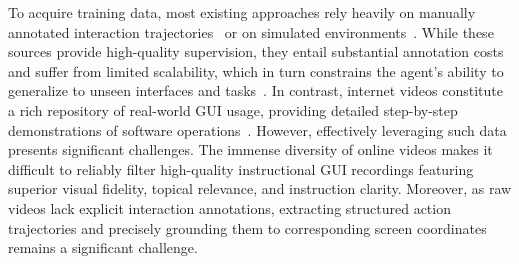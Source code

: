 \documentclass{article}
\theoremstyle{plain}
\theoremstyle{definition}
\theoremstyle{remark}
\begin{document}
To acquire training data, most existing approaches rely heavily on manually annotated interaction trajectories~\citep{deka2017rico, rawles2023androidinthewild} or on simulated environments~\citep{shvo2021appbuddy, lee2024benchmarking}. While these sources provide high-quality supervision, they entail substantial annotation costs and suffer from limited scalability, which in turn constrains the agent’s ability to generalize to unseen interfaces and tasks~\citep{gao2024multi}. In contrast, internet videos constitute a rich repository of real-world GUI usage, providing detailed step-by-step demonstrations of software operations~\citep{zhang2025tongui}. However, effectively leveraging such data presents significant challenges. 
The immense diversity of online videos makes it difficult to reliably filter high-quality instructional GUI recordings featuring superior visual fidelity, topical relevance, and instruction clarity. Moreover, as raw videos lack explicit interaction annotations, extracting structured action trajectories and precisely grounding them to corresponding screen coordinates remains a significant challenge.
\end{document}
